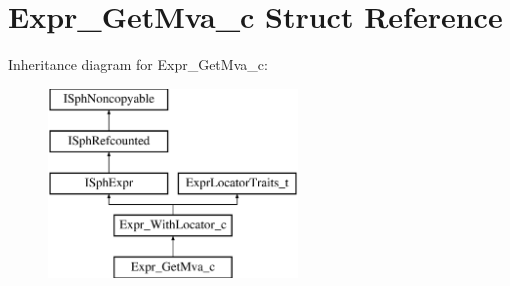 \hypertarget{structExpr__GetMva__c}{\section{Expr\-\_\-\-Get\-Mva\-\_\-c Struct Reference}
\label{structExpr__GetMva__c}
}
Inheritance diagram for Expr\-\_\-\-Get\-Mva\-\_\-c\-:\begin{figure}[H]
\begin{center}
\leavevmode
\includegraphics[height=5.000000cm]{structExpr__GetMva__c}
\end{center}
\end{figure}
